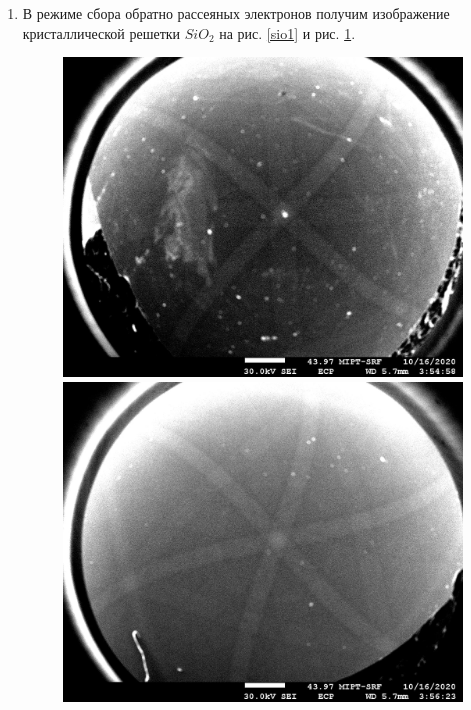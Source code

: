 \documentclass[a4paper]{article}
\begin{document}
\begin{enumerate}
    \item В режиме сбора обратно рассеяных электронов получим изображение кристаллической решетки $SiO_2$ на рис. \ref{sio1} и рис. \ref{sio2}. 
    
    \begin{figure}[H]
        \begin{center}
        \begin{minipage}[h]{0.45\linewidth}
        \includegraphics[width=1\linewidth]{Si01.jpg}
        \caption{} 
        \label{sio1}
        \end{minipage}
        \hfill 
        \begin{minipage}[h]{0.45\linewidth}
        \includegraphics[width=1\linewidth]{Si02.jpg}
        \caption{}
        \label{sio2}
        \end{minipage}
        \end{center}
    \end{figure}


\end{enumerate}
\end{document}
